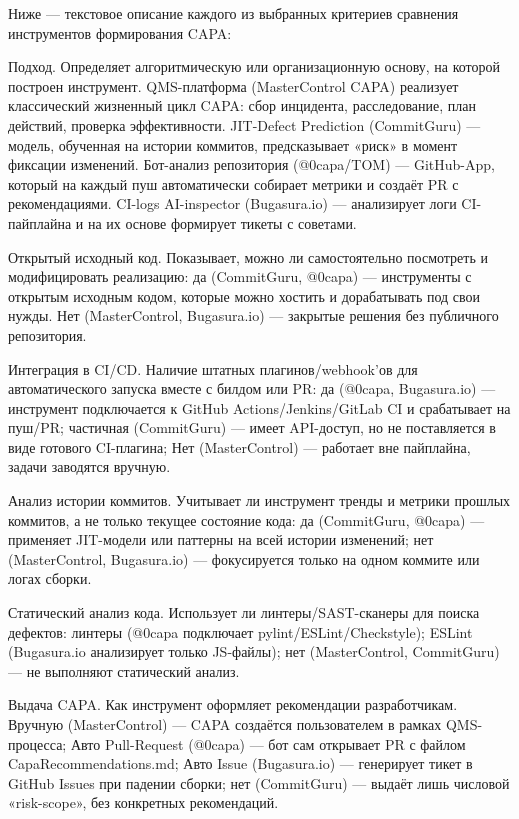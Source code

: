 Ниже — текстовое описание каждого из выбранных критериев сравнения инструментов формирования CAPA:


Подход. Определяет алгоритмическую или организационную основу, на которой построен инструмент. QMS-платформа (MasterControl CAPA) реализует классический жизненный цикл CAPA: сбор инцидента, расследование, план действий, проверка эффективности. JIT-Defect Prediction (CommitGuru) — модель, обученная на истории коммитов, предсказывает «риск» в момент фиксации изменений. Бот-анализ репозитория (@0capa/TOM) — GitHub-App, который на каждый пуш автоматически собирает метрики и создаёт PR с рекомендациями. CI-logs AI-inspector (Bugasura.io) — анализирует логи CI-пайплайна и на их основе формирует тикеты с советами.

Открытый исходный код. Показывает, можно ли самостоятельно посмотреть и модифицировать реализацию: да (CommitGuru, @0capa) — инструменты с открытым исходным кодом, которые можно хостить и дорабатывать под свои нужды. Нет (MasterControl, Bugasura.io) — закрытые решения без публичного репозитория.

Интеграция в CI/CD. Наличие штатных плагинов/webhook’ов для автоматического запуска вместе с билдом или PR: да (@0capa, Bugasura.io) — инструмент подключается к GitHub Actions/Jenkins/GitLab CI и срабатывает на пуш/PR; частичная (CommitGuru) — имеет API-доступ, но не поставляется в виде готового CI-плагина; Нет (MasterControl) — работает вне пайплайна, задачи заводятся вручную.

Анализ истории коммитов. Учитывает ли инструмент тренды и метрики прошлых коммитов, а не только текущее состояние кода: да (CommitGuru, @0capa) — применяет JIT-модели или паттерны на всей истории изменений; нет (MasterControl, Bugasura.io) — фокусируется только на одном коммите или логах сборки.

Статический анализ кода. Использует ли линтеры/SAST-сканеры для поиска дефектов: линтеры (@0capa подключает pylint/ESLint/Checkstyle); ESLint (Bugasura.io анализирует только JS-файлы); нет (MasterControl, CommitGuru) — не выполняют статический анализ.

Выдача CAPA. Как инструмент оформляет рекомендации разработчикам. Вручную (MasterControl) — CAPA создаётся пользователем в рамках QMS-процесса; Авто Pull-Request (@0capa) — бот сам открывает PR с файлом CapaRecommendations.md; Авто Issue (Bugasura.io) — генерирует тикет в GitHub Issues при падении сборки; нет (CommitGuru) — выдаёт лишь числовой «risk-scope», без конкретных рекомендаций.

